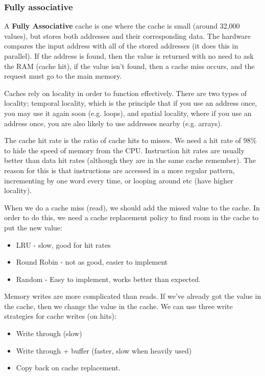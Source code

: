 \subsubsection{Fully associative}

A \textbf{Fully Associative} cache is one where the cache is small (around
32,000 values), but stores both addresses and their corresponding data. The
hardware compares the input address with all of the stored addresses (it does
this in parallel). If the address is found, then the value is returned with no
need to ask the RAM (cache hit), if the value isn't found, then a cache miss
occurs, and the request must go to the main memory.

Caches rely on locality in order to function effectively. There are two types of
locality; temporal locality, which is the principle that if you use an address
once, you may use it again soon (e.g. loops), and spatial locality, where if you
use an address once, you are also likely to use addresses nearby (e.g. arrays).


The cache hit rate is the ratio of cache hits to misses. We need a hit rate of
$98\%$ to hide the speed of memory from the CPU. Instruction hit rates are
usually better than data hit rates (although they are in the same cache
remember). The reason for this is that instructions are accessed in a more
regular pattern, incrementing by one word every time, or looping around etc
(have higher locality).

When we do a cache miss (read), we should add the missed value to the cache. In
order to do this, we need a cache replacement policy to find room in the cache
to put the new value:

\begin{itemize}
	\item LRU - slow, good for hit rates
	\item Round Robin - not as good, easier to implement
	\item Random - Easy to implement, works better than expected.
\end{itemize}

Memory writes are more complicated than reads. If we've already got the value in
the cache, then we change the value in the cache. We can use three write
strategies for cache writes (on hits):

\begin{itemize}
	\item Write through (slow)
	\item Write through + buffer (faster, slow when heavily used)
	\item Copy back on cache replacement.
\end{itemize}

